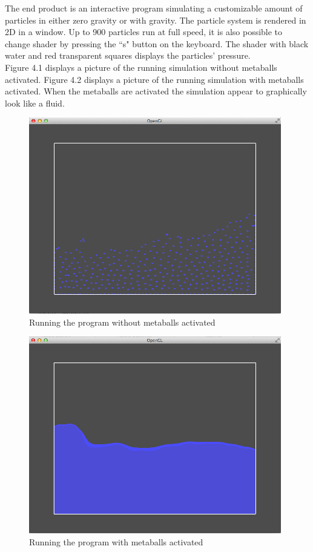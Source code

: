 \documentclass[a4paper,12pt,twoside,final]{report}
\begin{document}
\noindent The end product is an interactive program simulating a customizable amount of particles in either zero gravity or with gravity. The particle system is rendered in 2D in a window. Up to 900 particles run at full speed, it is also possible to change shader by pressing the “s" button on the keyboard. The shader with black water and red transparent squares displays the particles’ pressure. \\

\noindent Figure 4.1 displays a picture of the running simulation without metaballs activated. Figure 4.2 displays a picture of the running simulation with metaballs activated. When the metaballs are activated the simulation appear to graphically look like a fluid.

\newpage

\begin{figure}[H]
\begin{center}
    \includegraphics[width=11cm]{figs/image_2.png} 
\end{center}
\caption{Running the program without metaballs activated}
\label{water 2}
\end{figure}

\begin{figure}[h]
\begin{center}
    \includegraphics[width=11cm]{figs/image_1.png} 
\end{center}
\caption{Running the program with metaballs activated}
\label{water 1}
\end{figure}
\end{document}
